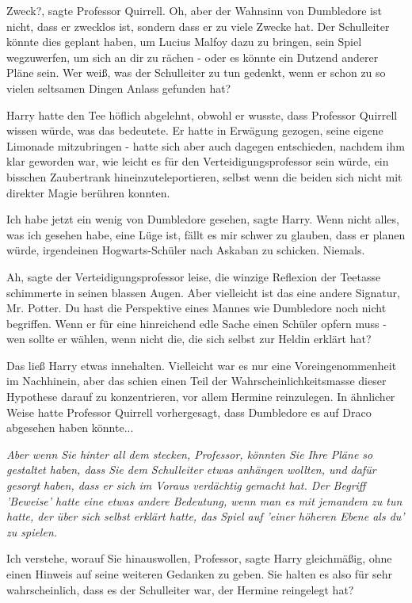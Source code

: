 \glqq{}Zweck?\grqq{}, sagte Professor Quirrell. \glqq{}Oh, aber der Wahnsinn von
Dumbledore ist nicht, dass er zwecklos ist, sondern dass er zu viele Zwecke hat.
Der Schulleiter könnte dies geplant haben, um Lucius Malfoy dazu zu bringen,
sein Spiel wegzuwerfen, um sich an dir zu rächen - oder es könnte ein Dutzend
anderer Pläne sein. Wer weiß, was der Schulleiter zu tun gedenkt, wenn er schon
zu so vielen seltsamen Dingen Anlass gefunden hat?\grqq{}

Harry hatte den Tee höflich abgelehnt, obwohl er wusste, dass Professor Quirrell
wissen würde, was das bedeutete. Er hatte in Erwägung gezogen, seine eigene
Limonade mitzubringen - hatte sich aber auch dagegen entschieden, nachdem ihm
klar geworden war, wie leicht es für den Verteidigungsprofessor sein würde, ein
bisschen Zaubertrank hineinzuteleportieren, selbst wenn die beiden sich nicht
mit direkter Magie berühren konnten.

\glqq{}Ich habe jetzt ein wenig von Dumbledore gesehen\grqq{}, sagte Harry. \glqq{}
Wenn nicht alles, was ich gesehen habe, eine Lüge ist, fällt es mir schwer zu
glauben, dass er planen würde, irgendeinen Hogwarts-Schüler nach Askaban zu
schicken. Niemals.\grqq{}

\glqq{}Ah\grqq{}, sagte der Verteidigungsprofessor leise, die winzige Reflexion
der Teetasse schimmerte in seinen blassen Augen. \glqq{}Aber vielleicht ist das
eine andere Signatur, Mr. Potter. Du hast die Perspektive eines Mannes wie
Dumbledore noch nicht begriffen. Wenn er für eine hinreichend edle Sache einen
Schüler opfern muss - wen sollte er wählen, wenn nicht die, die sich selbst zur
Heldin erklärt hat?\grqq{}

Das ließ Harry etwas innehalten. Vielleicht war es nur eine Voreingenommenheit
im Nachhinein, aber das schien einen Teil der Wahrscheinlichkeitsmasse dieser
Hypothese darauf zu konzentrieren, vor allem Hermine reinzulegen. In ähnlicher
Weise hatte Professor Quirrell vorhergesagt, dass Dumbledore es auf Draco
abgesehen haben könnte...

\emph{Aber wenn Sie hinter all dem stecken, Professor, könnten Sie Ihre Pläne so
gestaltet haben, dass Sie dem Schulleiter etwas anhängen wollten, und dafür
gesorgt haben, dass er sich im Voraus verdächtig gemacht hat. Der Begriff
'Beweise' hatte eine etwas andere Bedeutung, wenn man es mit jemandem zu tun
hatte, der über sich selbst erklärt hatte, das Spiel auf 'einer höheren Ebene
als du' zu spielen.}

\glqq{}Ich verstehe, worauf Sie hinauswollen, Professor\grqq{}, sagte Harry
gleichmäßig, ohne einen Hinweis auf seine weiteren Gedanken zu geben. \glqq{}Sie
halten es also für sehr wahrscheinlich, dass es der Schulleiter war, der Hermine
reingelegt hat?\grqq{}

